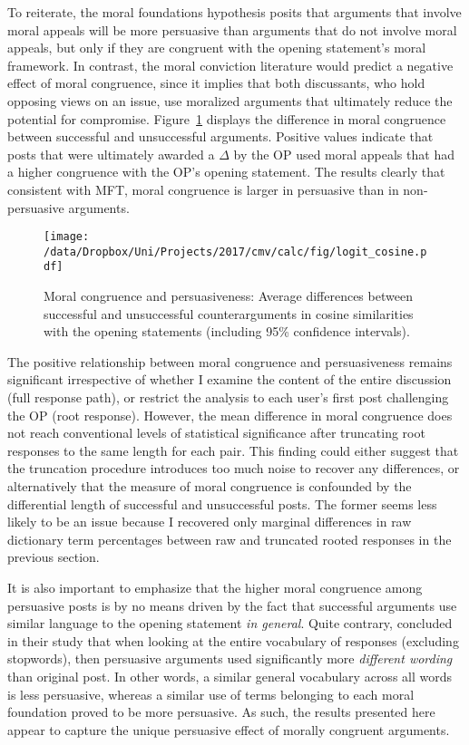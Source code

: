 To reiterate, the moral foundations hypothesis posits that arguments that involve moral appeals will be more persuasive than arguments that do not involve moral appeals, but only if they are congruent with the opening statement's moral framework. In contrast, the moral conviction literature would predict a negative effect of moral congruence, since it implies that both discussants, who hold opposing views on an issue, use moralized arguments that ultimately reduce the potential for compromise. Figure~\ref{fig:cosine} displays the difference in moral congruence between successful and unsuccessful arguments. Positive values indicate that posts that were ultimately awarded a $\Delta$ by the OP used moral appeals that had a higher congruence with the OP's opening statement. The results clearly that consistent with MFT, moral congruence is larger in persuasive than in non-persuasive arguments.

\clearpage
\begin{figure}[ht]
\centering
\texttt{[image: /data/Dropbox/Uni/Projects/2017/cmv/calc/fig/logit\_cosine.pdf]}
\caption[Moral congruence and persuasiveness]{Moral congruence and persuasiveness: Average differences between successful and unsuccessful counterarguments in cosine similarities with the opening statements (including 95\% confidence intervals).}\label{fig:cosine}
\end{figure}

The positive relationship between moral congruence and persuasiveness remains significant irrespective of whether I examine the content of the entire discussion (full response path), or restrict the analysis to each user's first post challenging the OP (root response). However, the mean difference in moral congruence does not reach conventional levels of statistical significance after truncating root responses to the same length for each pair. This finding could either suggest that the truncation procedure introduces too much noise to recover any differences, or alternatively that the measure of moral congruence is confounded by the differential length of successful and unsuccessful posts. The former seems less likely to be an issue because I recovered only marginal differences in raw dictionary term percentages between raw and truncated rooted responses in the previous section.

It is also important to emphasize that the higher moral congruence among persuasive posts is by no means driven by the fact that successful arguments use similar language to the opening statement \textit{in general}. Quite contrary, \citet[618]{tan2016winning} concluded in their study that when looking at the entire vocabulary of responses (excluding stopwords),  then persuasive arguments used significantly more \textit{different wording} than original post. In other words, a similar general vocabulary across all words is less persuasive, whereas a similar use of terms belonging to each moral foundation proved to be more persuasive. As such, the results presented here appear to capture the unique persuasive effect of morally congruent arguments.



